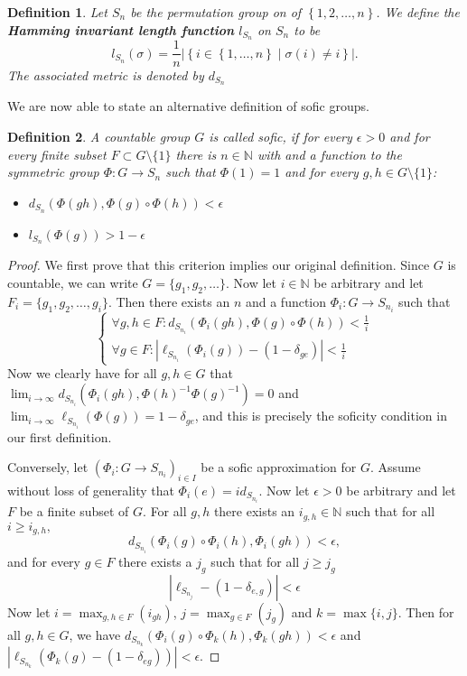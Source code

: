 \documentclass[titlepage, a4paper]{article}
\newcommand{\N}{\mathbb{N}}
\newcommand{\card}[1]{\left| #1 \right|}
\newtheorem{definition}{Definition}
\theoremstyle{remark}
\begin{document}
	\begin{definition}
		Let $S_n$ be the permutation group on of $\left\{ 1,2,\ldots,n \right\} $. 
		We define the \textbf{Hamming invariant length function} $l_{S_n}$ on $S_n$ to be \[
			l_{S_n}(\sigma) = \frac{1}{n} \card{\left\{ i \in \left\{ 1, \ldots, n \right\} \mid \sigma(i)\ne i \right\} }
		.\] 
		The associated metric is denoted by $d_{S_n}$
	\end{definition}
	We are now able to state an alternative definition of sofic groups.
	\begin{definition} %
		A countable group $G$ is called sofic, if for every $\epsilon > 0$ and for every finite subset  $F \subset G\setminus\{1\}$ there is $n \in \N$ with and a function to the symmetric group $\Phi: G \to S_n$ such that $\Phi(1) = 1$ and for every  $g, h \in G\setminus \{1\} $:
		\begin{itemize}
			\item $d_{S_n}\left( \Phi(gh), \Phi(g) \circ \Phi(h) \right) < \epsilon$
			\item $l_{S_n} \left( \Phi(g) \right) > 1-\epsilon$
		\end{itemize}
	\end{definition}

    \begin{proof}
    We first prove that this criterion implies our original definition. Since $G$ is countable, we can write $G = \{g_1, g_2, \dots\}$. Now let $i \in \N$ be arbitrary and let $F_i = \{ g_1, g_2, \dots, g_i\}$. Then there exists an $n$ and a function $\Phi_i: G \to S_{n_i}$ such that
    \[
        \begin{cases}
        \forall g, h \in F: d_{S_{n_i}}(\Phi_i(gh), \Phi(g) \circ \Phi(h)) < \frac 1 i \\
        \forall g \in F: \left|\ell_{S_{n_i}}(\Phi_i(g)) - (1 - \delta_{ge}) \right|< \frac 1 i
        \end{cases}
   \]
   Now we clearly have for all $g,h \in G$ that $\lim_{i \to \infty} d_{S_{n_i}}(\Phi_i(gh), \Phi(h)^{-1} \Phi(g)^{-1}) = 0$ and $\lim_{i \to \infty} \ell_{S_{n_i}}(\Phi(g)) = 1 - \delta_{ge}$,  and this is precisely the soficity condition in our first definition.

   Conversely, let $\left(\Phi_i: G \to S_{n_i} \right)_{i \in I}$ be a sofic approximation for $G$. Assume without loss of generality that $\Phi_i(e) = id_{S_{n_i}}$. Now let $\epsilon > 0$ be arbitrary and let $F$ be a finite subset of $G$.
   For all $g,h$ there exists an $i_{g,h} \in \N$ such that for all $i \geq i_{g,h},$
   \[
   d_{S_{n_i}}(\Phi_i(g) \circ \Phi_i(h), \Phi_i(gh)) < \epsilon,
   \]
   and for every $g \in F$ there exists a $j_g$ such that for all $j \geq j_g$
   \[
        \left| \ell_{S_{n_j}} - (1-\delta_{e,g}) \right| < \epsilon
   \]
   Now let $i = \max_{g,h \in F}(i_{gh})$, $j = \max_{g \in F}(j_g)$ and $k = \max\{i,j\}$.
   Then for all $g,h \in G$, we have
   $ d_{S_{n_k}}(\Phi_i(g) \circ \Phi_k(h), \Phi_k(gh)) < \epsilon$ and $\left| \ell_{S_{n_k}} (\Phi_k(g) - (1- \delta_{eg})) \right| < \epsilon$.

    \end{proof}
\end{document}
